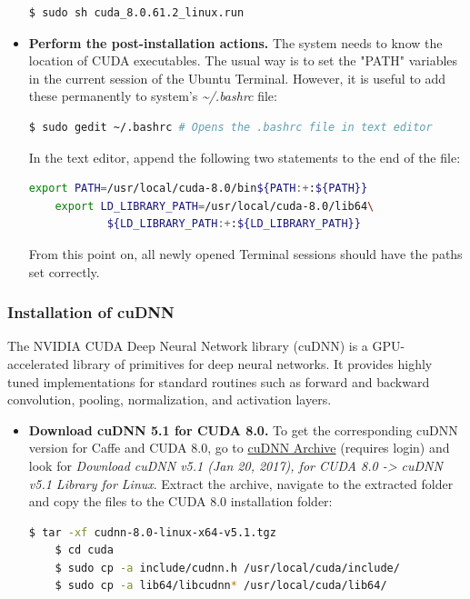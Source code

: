 \begin{itemize}
	\begin{lstlisting}[language=bash]
	$ sudo sh cuda_8.0.61.2_linux.run
	\end{lstlisting}
	
	\item \textbf{Perform the post-installation actions.} The system needs to know the location of CUDA executables. The usual way is to set the "PATH" variables in the current session of the Ubuntu Terminal. However, it is useful to add these permanently to system's \textit{\textasciitilde{}/.bashrc} file:
		
	\begin{lstlisting}[language=bash]
	$ sudo gedit ~/.bashrc # Opens the .bashrc file in text editor
	\end{lstlisting}
	
	In the text editor, append the following two statements to the end of the file:
	
	\begin{lstlisting}[language=bash]
	export PATH=/usr/local/cuda-8.0/bin${PATH:+:${PATH}}
	export LD_LIBRARY_PATH=/usr/local/cuda-8.0/lib64\
			${LD_LIBRARY_PATH:+:${LD_LIBRARY_PATH}}
	\end{lstlisting}	
	
	From this point on, all newly opened Terminal sessions should have the paths set correctly.
	
\end{itemize}

\subsubsection{Installation of cuDNN}

The NVIDIA CUDA Deep Neural Network library (cuDNN) is a GPU-accelerated library of primitives for deep neural networks. It provides highly tuned implementations for standard routines such as forward and backward convolution, pooling, normalization, and activation layers. \cite{nvidia_dev} 

\begin{itemize}
	\item \textbf{Download cuDNN 5.1 for CUDA 8.0.} To get the corresponding cuDNN version for Caffe and CUDA 8.0, go to \href{https://developer.nvidia.com/rdp/cudnn-archive}{cuDNN Archive} (requires login) and look for \textit{Download cuDNN v5.1 (Jan 20, 2017), for CUDA 8.0 -> cuDNN v5.1 Library for Linux}. Extract the archive, navigate to the extracted folder and copy the files to the CUDA 8.0 installation folder: \cite{nvidia_dev} 
	
	\newpage
	\begin{lstlisting}[language=bash]
	$ tar -xf cudnn-8.0-linux-x64-v5.1.tgz 
	$ cd cuda
	$ sudo cp -a include/cudnn.h /usr/local/cuda/include/
	$ sudo cp -a lib64/libcudnn* /usr/local/cuda/lib64/
	\end{lstlisting}	
\end{itemize}

